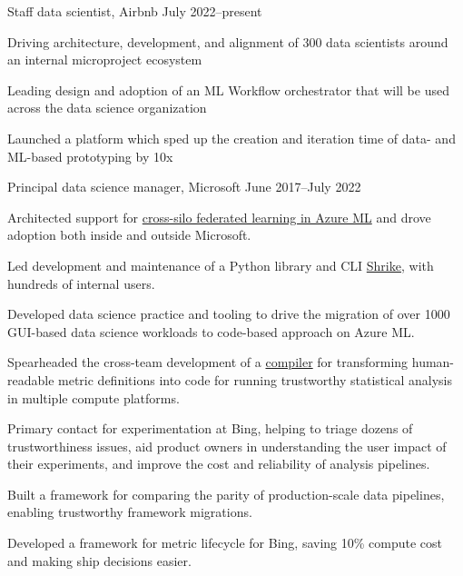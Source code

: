 \documentclass[11pt, letterpaper]{awesome-cv}
\begin{document}
\begin{cventries}

  \cventry
  {Staff data scientist, Airbnb}
  {}{}
  {July 2022--present}
  {
    \begin{cvitems}
      \item{Driving architecture, development, and alignment of 300 data scientists around an internal microproject ecosystem}
      \item{Leading design and adoption of an ML Workflow orchestrator that will be used across the data science organization}
      \item{Launched a platform which sped up the creation and iteration time of data- and ML-based prototyping by 10x}
    \end{cvitems}
  }

\cventry
  {Principal data science manager, Microsoft}
  {}{}
  {June 2017--July 2022}
  {
    \begin{cvitems}
      \item{Architected support for \href{https://github.com/Azure-Samples/azure-ml-federated-learning}{cross-silo federated learning in Azure ML} and drove adoption both inside and outside Microsoft.}
      \item{Led development and maintenance of a Python library and CLI \href{http://shrike-docs.com/}{Shrike}, with hundreds of internal users.}
      \item{Developed data science practice and tooling to drive the migration of over 1000 GUI-based data science workloads to code-based approach on Azure ML.}
      \item{Spearheaded the cross-team development of a \href{https://arxiv.org/abs/1912.00913}{compiler} for transforming human-readable metric definitions into code for running trustworthy statistical analysis in multiple compute platforms.}
      \item{Primary contact for experimentation at Bing, helping to triage dozens of trustworthiness issues, aid product owners in understanding the user impact of their experiments, and improve the cost and reliability of analysis pipelines.}
      \item{Built a framework for comparing the parity of production-scale data pipelines, enabling trustworthy framework migrations.}
      \item{Developed a framework for metric lifecycle for Bing, saving 10\% compute cost and making ship decisions easier.}
    \end{cvitems}
  }


\end{cventries}
\end{document}
